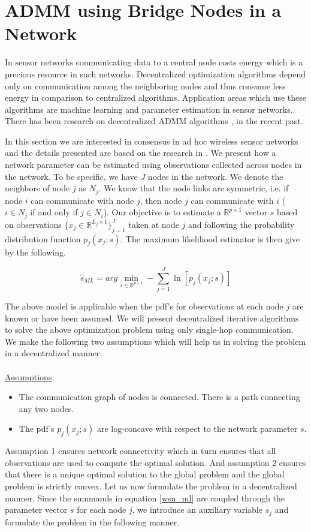 \documentclass[letterpaper, 10 pt, conference]{ieeeconf}  %
\begin{document}
\section{ADMM using Bridge Nodes in a Network}  \label{section_wsn}

In sensor networks communicating data to a central node costs energy which is a precious resource in such networks. Decentralized optimization algorithms depend only on communication among the neighboring nodes and thus consume less energy in comparison to centralized algorithms. Application areas which use these algorithms are machine learning and parameter estimation in sensor networks. There has been research on decentralized ADMM algorithms \cite{wei2012distributed}, \cite{mota2013d} in the recent past.

In this section we are interested in consensus in ad hoc wireless sensor networks and the details presented are based on the research in \cite{schizas2008consensus}. We present how a network parameter can be estimated using observations collected across nodes in the network. To be specific, we have $J$ nodes in the network. We denote the neighbors of node $j$ as $N_j$. We know that the node links are symmetric, i.e. if node $i$ can communicate with node $j$, then node $j$ can communicate with $i$ ($i \in N_j$ if and only if $j \in N_i$). Our objective is to estimate a $\mathbb{R}^{p \times 1}$ vector $s$ based on observations $\{x_j \in \mathbb{R}^{L_j \times 1}\}_{j=1}^{J}$ taken at node $j$ and following the probability distribution function $p_j(x_j;s)$. The maximum likelihood estimator is then give by the following.

\begin{equation}  \label{wsn_ml}
\hat{s}_{ML} = arg \min_{s \in \mathbb{R}^{p \times 1}} - \sum_{j=1}^{J} \ln [p_j(x_j;s)]
\end{equation}

The above model is applicable when the pdf's for observations at each node $j$ are known or have been assumed. We will present decentralized iterative algorithms to solve the above optimization problem using only single-hop communication. We make the following two assumptions which will help us in solving the problem in a decentralized manner.\\ \\
\underline{Assumptions}:
\begin{itemize}
\item The communication graph of nodes is connected. There is a path connecting any two nodes.
\item The pdf's $p_j(x_j;s)$ are log-concave with respect to the network parameter $s$.
\end{itemize}
Assumption 1 ensures network connectivity which in turn ensures that all observations are used to compute the optimal solution. And assumption 2 ensures that there is a unique optimal solution to the global problem and the global problem is strictly convex. Let us now formulate the problem in a decentralized manner. Since the summands in equation \ref{wsn_ml} are coupled through the parameter vector $s$ for each node $j$, we introduce an auxiliary variable $s_j$ and formulate the problem in the following manner.
\end{document}
